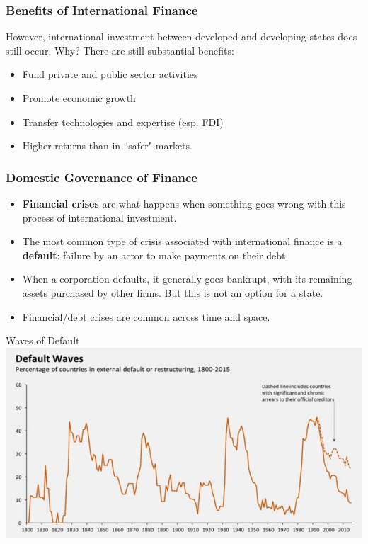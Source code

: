 \documentclass{beamer}
\begin{document}
\begin{frame} 
	\frametitle{\LARGE{Benefits of International Finance}}
However, international investment between developed and developing states does still occur. Why? There are still substantial benefits: \pause
	\begin{itemize}
			    \item Fund private and public sector activities \pause 
			    \item Promote economic growth \pause 
			    \item Transfer technologies and expertise (esp. FDI)  \pause
			    \item Higher returns than in ``safer" markets.		
	\end{itemize}
\end{frame}

\begin{frame} 
	\frametitle{\LARGE{Domestic Governance of Finance}}
	\begin{itemize}
			\item \textbf{Financial crises} are what happens when something goes wrong with this process of international investment. \pause
			\item The most common type of crisis associated with international finance is a \textbf{default}: failure by an actor to make payments on their debt. \pause
			\item When a corporation defaults, it generally goes bankrupt, with its remaining assets purchased by other firms. But this is not an option for a state.
			\item Financial/debt crises are common across time and space.
	\end{itemize}
\end{frame}

\begin{frame}{\LARGE Waves of Default}
    \centering
\includegraphics[width=\textwidth,height=0.8\textheight,keepaspectratio]{default waves.JPG}
\end{frame}
\end{document}
